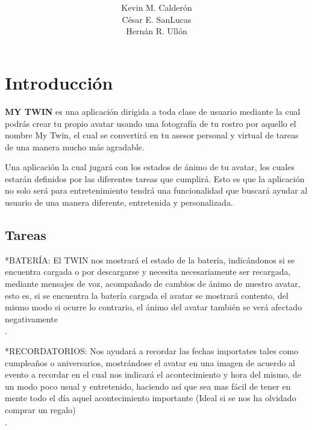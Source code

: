 \documentclass[12pt]{article}
\title{{\LARGE \textbf{\color{blue}{MY TWIN}}}}
\author{Kevin M. Calder\'on\\C\'esar E. SanLucas\\Hern\'an R. Ull\'on}
\date{}
\begin{document}
\maketitle


\newpage
\section{Introducción} 

\textbf{MY TWIN} es una aplicación dirigida a toda clase de usuario mediante la cual podrás crear tu propio avatar usando una fotografía de tu rostro por aquello el nombre My Twin, el cual se convertirá en tu asesor personal y virtual de tareas de una manera mucho más agradable. 

Una aplicación la cual jugará con los estados de ánimo de tu avatar, los cuales estarán definidos por las diferentes tareas que cumplirá. Esto es que la aplicación no solo será para entretenimiento tendrá una funcionalidad que buscará ayudar al usuario de una manera diferente, entretenida y personalizada.\\
\subsection{Tareas} 

\hspace{0.2in}*BATERÍA: El TWIN  nos  mostrará el estado de la batería, indicándonos si se encuentra cargada o por descargarse y necesita necesariamente ser recargada, mediante mensajes de voz, acompañado de cambios de ánimo de nuestro avatar, esto es, si se encuentra la batería cargada el avatar se mostrará contento, del mismo modo si ocurre lo contrario, el ánimo del avatar también se verá afectado negativamente\\. 

\hspace{0.2in}*RECORDATORIOS: Nos ayudará a recordar las fechas importates tales como cumpleaños o aniversarios, mostrándose el avatar en una imagen de acuerdo al evento a recordar en el cual nos indicará el acontecimiento y hora del mismo, de un modo poco usual y entretenido, haciendo así que sea mas fácil de tener en mente todo el día aquel acontecimiento importante (Ideal si se nos ha olvidado comprar un regalo)\\. 
\end{document}
